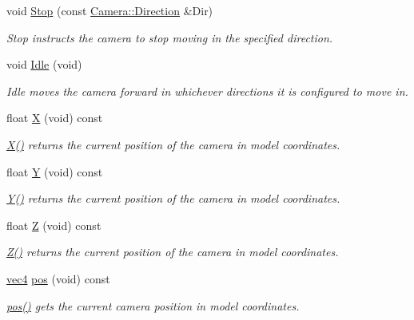 \begin{DoxyCompactItemize}
void \hyperlink{class_camera_adf064f765f610684e0675bd67de013fd}{Stop} (const \hyperlink{class_camera_a80cb65605322d27ad3b6d973484509ec}{Camera\-::\-Direction} \&Dir)
\begin{DoxyCompactList}\small\item\em Stop instructs the camera to stop moving in the specified direction. \end{DoxyCompactList}\item 
void \hyperlink{class_camera_aec3559fe43597656629fdb00157d3c73}{Idle} (void)
\begin{DoxyCompactList}\small\item\em Idle moves the camera forward in whichever directions it is configured to move in. \end{DoxyCompactList}\item 
float \hyperlink{class_camera_a2f7fd64d5d6e0dfb5edcca53c7d15994}{X} (void) const 
\begin{DoxyCompactList}\small\item\em \hyperlink{class_camera_a2f7fd64d5d6e0dfb5edcca53c7d15994}{X()} returns the current position of the camera in model coordinates. \end{DoxyCompactList}\item 
float \hyperlink{class_camera_a37529ef93871f547ebfd5862bc6cce62}{Y} (void) const 
\begin{DoxyCompactList}\small\item\em \hyperlink{class_camera_a37529ef93871f547ebfd5862bc6cce62}{Y()} returns the current position of the camera in model coordinates. \end{DoxyCompactList}\item 
float \hyperlink{class_camera_abf1730e47e8e51c76acbddcaa85e2475}{Z} (void) const 
\begin{DoxyCompactList}\small\item\em \hyperlink{class_camera_abf1730e47e8e51c76acbddcaa85e2475}{Z()} returns the current position of the camera in model coordinates. \end{DoxyCompactList}\item 
\hyperlink{struct_angel_1_1vec4}{vec4} \hyperlink{class_camera_a9982ac5f48fe0af97fefa725080d6da6}{pos} (void) const 
\begin{DoxyCompactList}\small\item\em \hyperlink{class_camera_a9982ac5f48fe0af97fefa725080d6da6}{pos()} gets the current camera position in model coordinates. \end{DoxyCompactList}\item 

\end{DoxyCompactItemize}
